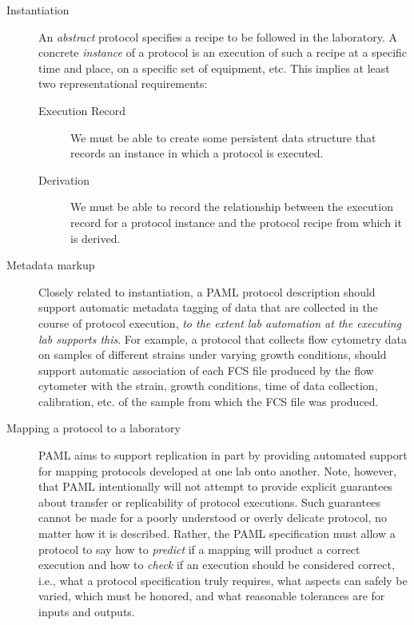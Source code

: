 \begin{description}
\item[Instantiation] An \emph{abstract} protocol specifies a recipe to be followed in the laboratory.  A concrete \emph{instance} of a protocol is an execution of such a recipe at a specific time and place, on a specific set of equipment, etc.  This implies at least two representational requirements:
  \begin{description}
  \item[Execution Record] We must be able to create some persistent data structure that records an instance in which a protocol is executed.
  \item[Derivation] We must be able to record the relationship between the execution record for a protocol instance and the protocol recipe from which it is derived.
  \end{description}

\item[Metadata markup] Closely related to instantiation, a PAML protocol description should support automatic metadata tagging of data that are collected in the course of protocol execution, \emph{to the extent lab automation at the executing lab supports this}.  
For example, a protocol that collects flow cytometry data on samples of different strains under varying growth conditions, should support automatic association of each FCS file produced by the flow cytometer with the strain, growth conditions, time of data collection, calibration, etc. of the sample from which the FCS file was produced.

\item[Mapping a protocol to a laboratory] PAML aims to support replication in part by providing automated support for mapping protocols developed at one lab onto another.  
Note, however, that PAML intentionally will not attempt to provide explicit guarantees about transfer or replicability of protocol executions. 
Such guarantees cannot be made for a poorly understood or overly delicate protocol, no matter how it is described.
Rather, the PAML specification must allow a protocol to say how to {\em predict} if a mapping will product a correct execution and how to {\em check} if an execution should be considered correct, i.e., what a protocol specification truly requires, what aspects can safely be varied, which must be honored, and what reasonable tolerances are for inputs and outputs. 


\end{description}
